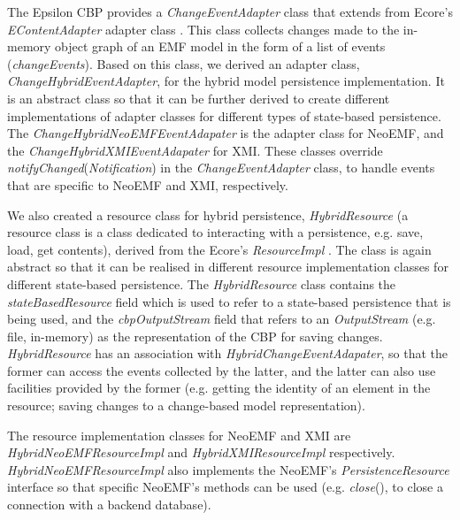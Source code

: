 \documentclass{llncs}
\begin{document}
\vspace{-15pt}
The Epsilon CBP provides a \textit{ChangeEventAdapter} class \cite{DBLP:conf/models/YohannisKP17} that extends from Ecore's \textit{EContentAdapter} adapter class%
. This class collects changes made to the in-memory object graph of an EMF model in the form of a list of events (\textit{changeEvents}). Based on this class, we derived an adapter class, \textit{ChangeHybridEventAdapter}, for the hybrid model persistence implementation. It is an abstract class so that it can be further derived to create different implementations of adapter classes for different types of state-based persistence. The \textit{ChangeHybridNeoEMFEventAdapater} is the adapter class for NeoEMF, and the \textit{ChangeHybridXMIEventAdapater} for XMI. These classes override \textit{notifyChanged}(\textit{Notification}) in the \textit{ChangeEventAdapter} class, to handle events that are specific to NeoEMF and XMI, respectively.

We also created a resource class for hybrid persistence, \textit{HybridResource} (a resource class is a class dedicated to interacting with a persistence, e.g. save, load, get contents), derived from the Ecore's \textit{ResourceImpl}%
. The class is again abstract so that it can be realised in different resource implementation classes for different state-based persistence. The \textit{HybridResource} class contains the \textit{stateBasedResource} field which is used to refer to a state-based persistence that is being used, and the \textit{cbpOutputStream} field that refers to an \textit{OutputStream} (e.g. file, in-memory) as the representation of the CBP for saving changes. \textit{HybridResource} has an association with \textit{HybridChangeEventAdapater}, so that the former can access the events collected by the latter, and the latter can also use facilities provided by the former (e.g. getting the identity of an element in the resource; saving changes to a change-based model representation).

The resource implementation classes for NeoEMF and XMI are \textit{HybridNeoEMFResourceImpl} and \textit{HybridXMIResourceImpl} respectively. \textit{HybridNeoEMFResourceImpl} also implements the NeoEMF's \textit{PersistenceResource} interface %
so that specific NeoEMF's methods can be used (e.g. \textit{close}(), to close a connection with a backend database).
\end{document}
